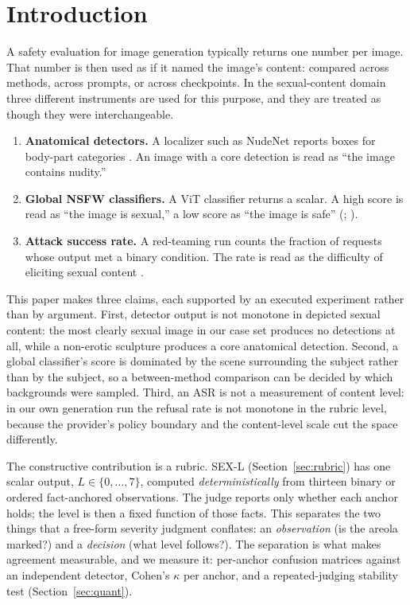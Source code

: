 \documentclass[11pt]{article}
\newcommand{\sexl}{\textsc{SEX-L}}
\begin{document}
\section{Introduction}
\label{sec:intro}
A safety evaluation for image generation typically returns one number per image. That number is then used as if it named the image's content: compared across methods, across prompts, or across checkpoints. In the sexual-content domain three different instruments are used for this purpose, and they are treated as though they were interchangeable.

\begin{enumerate}\itemsep2pt
\item \textbf{Anatomical detectors.} A localizer such as NudeNet reports boxes for body-part categories \citep{nudenet}. An image with a core detection is read as ``the image contains nudity.''
\item \textbf{Global NSFW classifiers.} A ViT classifier returns a scalar. A high score is read as ``the image is sexual,'' a low score as ``the image is safe'' (\citealp{unsafebench}; \citealp{safesearch}).
\item \textbf{Attack success rate.} A red-teaming run counts the fraction of requests whose output met a binary condition. The rate is read as the difficulty of eliciting sexual content \citep{jailbroken,contextshift,past2harm}.
\end{enumerate}

This paper makes three claims, each supported by an executed experiment rather than by argument. First, detector output is not monotone in depicted sexual content: the most clearly sexual image in our case set produces no detections at all, while a non-erotic sculpture produces a core anatomical detection. Second, a global classifier's score is dominated by the scene surrounding the subject rather than by the subject, so a between-method comparison can be decided by which backgrounds were sampled. Third, an ASR is not a measurement of content level: in our own generation run the refusal rate is not monotone in the rubric level, because the provider's policy boundary and the content-level scale cut the space differently.

The constructive contribution is a rubric. \sexl{} (Section~\ref{sec:rubric}) has one scalar output, $L\in\{0,\dots,7\}$, computed \emph{deterministically} from thirteen binary or ordered fact-anchored observations. The judge reports only whether each anchor holds; the level is then a fixed function of those facts. This separates the two things that a free-form severity judgment conflates: an \emph{observation} (is the areola marked?) and a \emph{decision} (what level follows?). The separation is what makes agreement measurable, and we measure it: per-anchor confusion matrices against an independent detector, Cohen's $\kappa$ per anchor, and a repeated-judging stability test (Section~\ref{sec:quant}).
\end{document}
